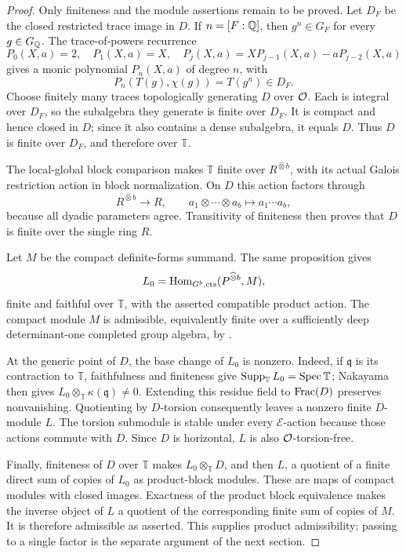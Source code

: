 \begin{proof}
Only finiteness and the module assertions remain to be proved.
Let $D_F$ be the closed restricted trace image in $D$.  If
$n=[F:\mathbb Q]$, then $g^n\in G_F$ for every $g\in G_\mathbb Q$.
The trace-of-powers recurrence
\[
 P_0(X,a)=2,\quad P_1(X,a)=X,\quad
 P_j(X,a)=XP_{j-1}(X,a)-aP_{j-2}(X,a)
\]
gives a monic polynomial $P_n(X,a)$ of degree $n$, with
\[
 P_n(T(g),\chi(g))=T(g^n)\in D_F.
\]
Choose finitely many traces topologically generating $D$ over
$\mathcal O$.  Each is integral over $D_F$, so the subalgebra they generate
is finite over $D_F$.  It is compact and hence closed in $D$;
since it also contains a dense subalgebra, it equals $D$.
Thus $D$ is finite over $D_F$, and therefore over $\mathbb T$.

The local-global block comparison \cite[Proposition~4.2]{FM2}
makes $\mathbb T$ finite over
$R^{\widehat\otimes b}$, with its actual Galois restriction action
in block normalization.  On $D$ this action factors through
\[
 R^{\widehat\otimes b}\longrightarrow R,
 \qquad a_1\otimes\cdots\otimes a_b\longmapsto a_1\cdots a_b,
\]
because all dyadic parameters agree.  Transitivity of finiteness
then proves that $D$ is finite over the single ring $R$.

Let $M$ be the compact definite-forms summand.  The same proposition
gives
\[
 L_0=\operatorname{Hom}_{G^b,\mathrm{cts}}(P^{\widehat\otimes b},M),
\]
finite and faithful over $\mathbb T$, with the asserted compatible
product action.  The compact module $M$ is admissible, equivalently
finite over a sufficiently deep determinant-one completed group
algebra, by \cite[Proposition~4.1]{FM2}.

At the generic point of $D$, the base change of $L_0$ is nonzero.
Indeed, if $\mathfrak q$ is its contraction to $\mathbb T$,
faithfulness and finiteness give
$\operatorname{Supp}_{\mathbb T}L_0=\operatorname{Spec}\mathbb T$; Nakayama
then gives $L_0\otimes_{\mathbb T}\kappa(\mathfrak q)\ne0$.
Extending this residue field to $\operatorname{Frac}(D)$ preserves nonvanishing.
Quotienting by $D$-torsion consequently leaves a nonzero finite
$D$-module $L$.  The torsion submodule is stable under every
$\mathcal E$-action because those actions commute with $D$.
Since $D$ is horizontal, $L$ is also $\mathcal O$-torsion-free.

Finally, finiteness of $D$ over $\mathbb T$ makes
$L_0\otimes_{\mathbb T}D$, and then $L$, a quotient of a finite
direct sum of copies of $L_0$ as product-block modules.  These are
maps of compact modules with closed images.  Exactness of the
product block equivalence makes the inverse object of $L$ a
quotient of the corresponding finite sum of copies of $M$.
It is therefore admissible as asserted.  This supplies product
admissibility; passing to a single factor is the separate argument
of the next section.
\end{proof}
